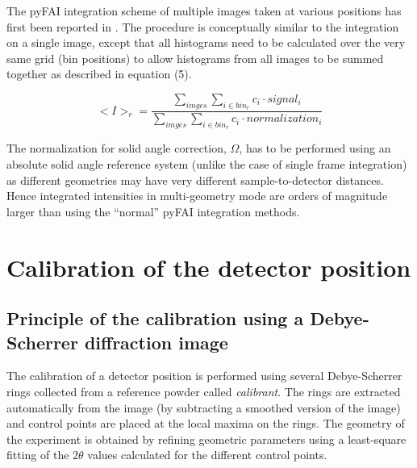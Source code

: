 \documentclass[preprint]{iucr}              %
\begin{document}
The pyFAI integration scheme of multiple images taken at various positions has
first been reported in . 
The procedure is conceptually similar to the integration on a single image,
except that all histograms need to be calculated over the very same
grid (bin positions) to allow histograms from all images to be summed together as described in equation (5). 

\begin{equation}
<I>_{r} = \frac{\sum\limits_{imges} \sum\limits_{i \in bin_r} c_i \cdot
signal_i} {\sum\limits_{imges} \sum\limits_{i \in bin_r} c_i \cdot
normalization_i} 
\end{equation}

The normalization for solid angle correction, $\Omega$, has to be performed
using an absolute solid angle reference system (unlike the case of single
frame integration) as different geometries may have very different
sample-to-detector distances.
Hence integrated intensities in multi-geometry mode are orders of
magnitude larger than using the ``normal'' pyFAI integration methods.

\section{Calibration of the detector position}

\subsection{Principle of the calibration using a Debye-Scherrer diffraction
image}
The calibration of a detector position is performed using several Debye-Scherrer
rings collected from a reference powder called \textit{calibrant}.
The rings are extracted automatically from the image (by subtracting a smoothed 
version of the image) and control points are placed at the
local maxima on the rings.
The geometry of the experiment is obtained by refining geometric parameters using 
a least-square fitting of the $2\theta$ values calculated for the different control points.
\end{document}
